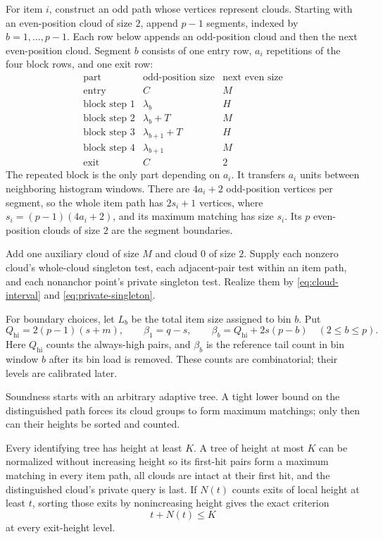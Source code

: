 For item $i$, construct an odd path whose vertices represent clouds.
Starting with an even-position cloud of size $2$, append $p-1$
segments, indexed by $b=1,\ldots,p-1$. Each row below appends an
odd-position cloud and then the next even-position cloud.
Segment $b$ consists of one entry row, $a_i$ repetitions of the
four block rows, and one exit row:
\[
 \begin{array}{c|c|c}
 \text{part}&\text{odd-position size}&\text{next even size}\\ \hline
 \text{entry}&C&M\\
 \text{block step 1}&\lambda_b&H\\
 \text{block step 2}&\lambda_b+T&M\\
 \text{block step 3}&\lambda_{b+1}+T&H\\
 \text{block step 4}&\lambda_{b+1}&M\\
 \text{exit}&C&2
 \end{array}
\]
The repeated block is the only part depending on $a_i$.
It transfers $a_i$ units between neighboring histogram windows.
There are $4a_i+2$ odd-position vertices per segment, so the
whole item path has $2s_i+1$ vertices, where
$s_i=(p-1)(4a_i+2)$, and its maximum matching has size $s_i$.
Its $p$ even-position clouds of size $2$ are the segment boundaries.

Add one auxiliary cloud of size $M$ and cloud $0$ of size $2$.
Supply each nonzero cloud's whole-cloud singleton test, each
adjacent-pair test within an item path, and each nonanchor point's
private singleton test. Realize them by \eqref{eq:cloud-interval}
and \eqref{eq:private-singleton}.


For boundary choices, let $L_b$ be the total item size assigned to bin
$b$. Put
\[
 Q_{\mathrm{hi}}=2(p-1)(s+m),\qquad
 \beta_1=q-s,\qquad
 \beta_b=Q_{\mathrm{hi}}+2s(p-b)\quad(2\le b\le p).
\]
Here $Q_{\mathrm{hi}}$ counts the always-high pairs, and $\beta_b$
is the reference tail count in bin window $b$ after its bin load is
removed. These counts are combinatorial; their levels are calibrated later.

Soundness starts with an arbitrary adaptive tree. A tight lower
bound on the distinguished path forces its cloud groups to form
maximum matchings; only then can their heights be sorted and counted.

\begin{proposition}
\label{prop:height-normalization}
Every identifying tree has height at least $K$. A tree of height at
most $K$ can be normalized without increasing height so its first-hit
pairs form a maximum matching in every item path, all clouds are
intact at their first hit, and the distinguished cloud's private query
is last. If $N(t)$ counts exits of local height at least $t$, sorting
those exits by nonincreasing height gives the exact criterion
\begin{equation}\label{eq:height-profile}
 t+N(t)\le K
\end{equation}
at every exit-height level.
\end{proposition}

